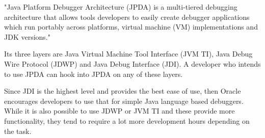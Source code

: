 \documentclass[..thesis.tex]{subfiles}
\begin{document}
"Java Platform Debugger Architecture (JPDA) is a multi-tiered debugging architecture that allows tools developers to easily create debugger applications which run portably across platforms, virtual machine (VM) implementations and JDK versions."\cite{oracle_jpda_spec} 

Its three layers are Java Virtual Machine Tool Interface (JVM TI), Java Debug Wire Protocol (JDWP) and Java Debug Interface (JDI). 
A developer who intends to use JPDA can hook into JPDA on any of these layers. \cite{oracle_jpda_spec} 



Since JDI is the highest level and provides the best ease of use, then Oracle encourages developers to use that for simple Java language based debuggers.\cite{oracle_jpda_spec}
While it is also possible to use JDWP or JVM TI and these provide more functionality, they tend to require a lot more development hours depending on the task. 
\end{document}
